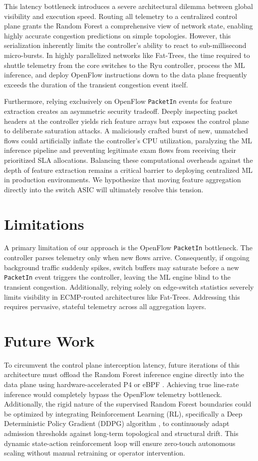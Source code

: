 \documentclass[journal]{IEEEtran}
\begin{document}
This latency bottleneck introduces a severe architectural dilemma between global visibility and execution speed. Routing all telemetry to a centralized control plane grants the Random Forest a comprehensive view of network state, enabling highly accurate congestion predictions on simple topologies. However, this serialization inherently limits the controller's ability to react to sub-millisecond micro-bursts. In highly parallelized networks like Fat-Trees, the time required to shuttle telemetry from the core switches to the Ryu controller, process the ML inference, and deploy OpenFlow instructions down to the data plane frequently exceeds the duration of the transient congestion event itself.

Furthermore, relying exclusively on OpenFlow \texttt{PacketIn} events for feature extraction creates an asymmetric security tradeoff. Deeply inspecting packet headers at the controller yields rich feature arrays but exposes the control plane to deliberate saturation attacks. A maliciously crafted burst of new, unmatched flows could artificially inflate the controller's CPU utilization, paralyzing the ML inference pipeline and preventing legitimate exam flows from receiving their prioritized SLA allocations. Balancing these computational overheads against the depth of feature extraction remains a critical barrier to deploying centralized ML in production environments. We hypothesize that moving feature aggregation directly into the switch ASIC will ultimately resolve this tension.

\section{Limitations}
A primary limitation of our approach is the OpenFlow \texttt{PacketIn} bottleneck. The controller parses telemetry only when new flows arrive. Consequently, if ongoing background traffic suddenly spikes, switch buffers may saturate before a new \texttt{PacketIn} event triggers the controller, leaving the ML engine blind to the transient congestion. Additionally, relying solely on edge-switch statistics severely limits visibility in ECMP-routed architectures like Fat-Trees. Addressing this requires pervasive, stateful telemetry across all aggregation layers.

\section{Future Work}
To circumvent the control plane interception latency, future iterations of this architecture must offload the Random Forest inference engine directly into the data plane using hardware-accelerated P4 or eBPF \cite{ref8, ref9}. Achieving true line-rate inference would completely bypass the OpenFlow telemetry bottleneck. Additionally, the rigid nature of the supervised Random Forest boundaries could be optimized by integrating Reinforcement Learning (RL), specifically a Deep Deterministic Policy Gradient (DDPG) algorithm \cite{ref10}, to continuously adapt admission thresholds against long-term topological and structural drift. This dynamic state-action reinforcement loop will ensure zero-touch autonomous scaling without manual retraining or operator intervention.
\end{document}
